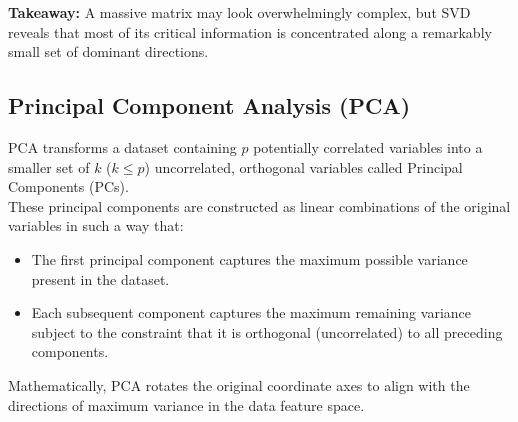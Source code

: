 \documentclass[DIV=20,oneside]{scrartcl}
\newcommand{\takeaway}[1]{%
	\begin{tcolorbox}[
		colback=black!20,
		colframe=black,
		boxrule=0.5pt,
		arc=2mm]
		\textbf{Takeaway: } #1
	\end{tcolorbox}
}
\begin{document}
\begin{itemize}
	\takeaway{A massive matrix may look overwhelmingly complex, but SVD reveals that most of its critical information is concentrated along a remarkably small set of dominant directions.
	}
	
	\subsection{Principal Component Analysis (PCA)}
	PCA transforms a dataset containing $p$ potentially correlated variables into a smaller set of $k$ ($k \le p$) uncorrelated, orthogonal variables called Principal Components (PCs).\\
	These principal components are constructed as linear combinations of the original variables in such a way that:
	\begin{itemize}
		\item 	The first principal component captures the maximum possible variance present in the dataset.
		
		\item Each subsequent component captures the maximum remaining variance subject to the constraint that it is orthogonal (uncorrelated) to all preceding components.
	\end{itemize}

	
	Mathematically, PCA rotates the original coordinate axes to align with the directions of maximum variance in the data feature space.	
\end{itemize}
\end{document}
